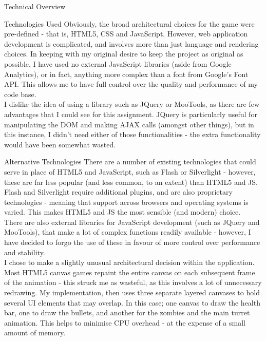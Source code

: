 \documentclass[11pt]{article}
\begin{document}
\begin{section}{Technical Overview}
    \begin{subsection}{Technologies Used}
    		Obviously, the broad architectural choices for the game were pre-defined - that is, HTML5, CSS and JavaScript. However, web application development is complicated, and involves more than just language and rendering choices. In keeping with my original desire to keep the project as original as possible, I have used no external JavaScript libraries (aside from Google Analytics\cite{GAnalytics}), or in fact, anything more complex than a font from Google's Font API\cite{GFonts}. This allows me to have full control over the quality and performance of my code base. \\
    		
    		I dislike the idea of using a library such as JQuery or MooTools, as there are few advantages that I could see for this assignment. JQuery is particularly useful for manipulating the DOM and making AJAX calls (amongst other things), but in this instance, I didn't need either of those functionalities - the extra functionality would have been somewhat wasted.
    \end{subsection}
    
    \begin{subsection}{Alternative Technologies}
    		There are a number of existing technologies that could serve in place of HTML5 and JavaScript, such as Flash or Silverlight - however, these are far less popular (and less common, to an extent) than HTML5 and JS. Flash and Silverlight require additional plugins, and are also proprietary technologies - meaning that support across browsers and operating systems is varied. This makes HTML5 and JS the most sensible (and modern) choice. \\
    		
    		There are also external libraries for JavaScript development (such as JQuery and MooTools), that make a lot of complex functions readily available - however, I have decided to forgo the use of these in favour of more control over performance and stability. \\
    		
    		I chose to make a slightly unusual architectural decision within the application. Most HTML5 canvas games repaint the entire canvas on each subsequent frame of the animation - this struck me as wasteful, as this involves a lot of unnecessary redrawing. My implementation, then uses three separate layered canvases to hold several UI elements that may overlap. In this case; one canvas to draw the health bar, one to draw the bullets, and another for the zombies and the main turret animation. This helps to minimise CPU overhead - at the expense of a small amount of memory.
    \end{subsection}
\end{section}
    
\end{document}
